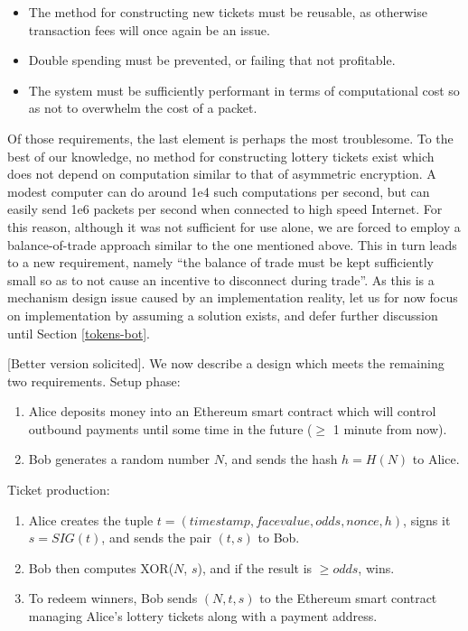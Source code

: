 \documentclass{article}
\begin{document}
\begin{itemize}
    \item The method for constructing new tickets must be reusable, as otherwise transaction fees will once again be an issue.
    \item Double spending must be prevented, or failing that not profitable.
    \item The system must be sufficiently performant in terms of computational cost so as not to overwhelm the cost of a packet.
\end{itemize}

Of those requirements, the last element is perhaps the most troublesome. To the best of our knowledge, no method for constructing lottery tickets exist which does not depend on computation similar to that of asymmetric encryption. A modest computer can do around 1e4 such computations per second, but can easily send 1e6 packets per second when connected to high speed Internet. For this reason, although it was not sufficient for use alone, we are forced to employ a balance-of-trade approach similar to the one mentioned above. This in turn leads to a new requirement, namely ``the balance of trade must be kept sufficiently small so as to not cause an incentive to disconnect during trade''. As this is a mechanism design issue caused by an implementation reality, let us for now focus on implementation by assuming a solution exists, and defer further discussion until Section \ref{tokens-bot}.

[Better version solicited]. We now describe a design which meets the remaining two requirements. Setup phase:

\begin{enumerate}
    \item Alice deposits money into an Ethereum smart contract which will control outbound payments until some time in the future ($\geq$ 1 minute from now).
    \item Bob generates a random number $N$, and sends the hash $h=H(N)$ to Alice.
\end{enumerate}

Ticket production:

\begin{enumerate}
    \item Alice creates the tuple $t = (timestamp, face value, odds, nonce, h)$, signs it $s = SIG(t)$, and sends the pair $(t, s)$ to Bob.
    \item Bob then computes XOR($N$, $s$), and if the result is $\geq odds$, wins.
    \item To redeem winners, Bob sends $(N, t, s)$ to the Ethereum smart contract managing Alice's lottery tickets along with a payment address.
\end{enumerate}
\end{document}
